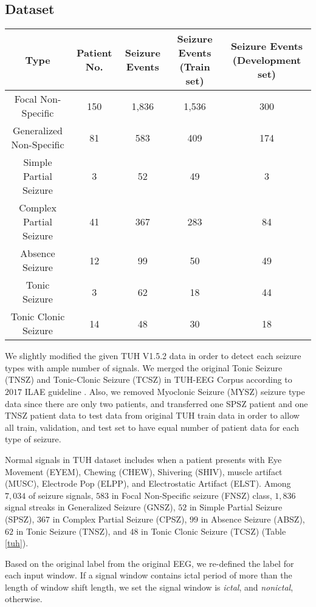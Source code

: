 \documentclass[pmlr,twocolumn,10pt]{jmlr}
\begin{document}
\subsection{Dataset}
\label{sec: app_dataset}
\begin{table*}[h!]
    \footnotesize
	\centering
	\caption{Construction of Temple University Hospital v 1.5.2 Dataset}
	\label{tuh}
	\begin{tabular}{c|cccc}
		\toprule
		Type & Patient No. & Seizure Events & Seizure Events (Train set) & Seizure Events (Development set) \\
		\midrule
		Focal Non-Specific & 150 &  1,836  & 1,536 & 300 \\
		Generalized Non-Specific  & 81 & 583 & 409 & 174 \\
		Simple Partial Seizure & 3 & 52 & 49 & 3 \\
		Complex Partial Seizure   & 41 & 367 & 283 & 84 \\
		Absence Seizure  & 12  & 99 & 50 & 49 \\
		Tonic Seizure  & 3  & 62 & 18 & 44 \\
		Tonic Clonic Seizure  & 14 & 48 & 30 & 18 \\
\bottomrule
	\end{tabular}
\end{table*} 
We slightly modified the given TUH V1.5.2 data in order to detect each seizure types with ample number of signals. We merged the original Tonic Seizure (TNSZ) and Tonic-Clonic Seizure (TCSZ) in TUH-EEG Corpus according to $2017$ ILAE guideline \citep{scheffer2017ilae}. Also, we removed Myoclonic Seizure (MYSZ) seizure type data since there are only two patients, and transferred one SPSZ patient and one TNSZ patient data to test data from original TUH train data in order to allow all train, validation, and test set to have equal number of patient data for each type of seizure. 

Normal signals in TUH dataset includes when a patient presents with Eye Movement (EYEM), Chewing (CHEW), Shivering (SHIV), muscle artifact (MUSC), Electrode Pop (ELPP), and Electrostatic Artifact (ELST). Among $7,034$ of seizure signals, $583$ in Focal Non-Specific seizure (FNSZ) class, $1,836$ signal streaks in Generalized Seizure (GNSZ),  $52$ in Simple Partial Seizure (SPSZ), $367$ in Complex Partial Seizure (CPSZ), $99$ in Absence Seizure (ABSZ), $62$ in Tonic Seizure (TNSZ), and $48$ in Tonic Clonic Seizure (TCSZ) (Table \ref{tuh}). 

Based on the original label from the original EEG, we re-defined the label for each input window. If a signal window contains ictal period of more than the length of window shift length, we set the signal window is \textit{ictal}, and \textit{nonictal}, otherwise.
\end{document}
